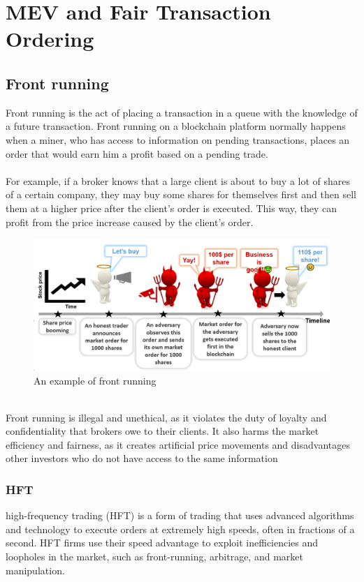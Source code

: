 \chapter{MEV and Fair Transaction Ordering}

\section{Front running}
Front running is the act of placing a transaction in a queue with the knowledge of a future transaction. Front running on a blockchain platform normally happens when a miner, who has access to information on pending transactions, places an order that would earn him a profit based on a pending trade.\\\\
For example, if a broker knows that a large client is about to buy a lot of shares of a certain company, they may buy some shares for themselves first and then sell them at a higher price after the client’s order is executed. This way, they can profit from the price increase caused by the client’s order.
\begin{figure}[h!]
	\centering
	\includegraphics[width=0.7\linewidth]{Fig/21/F1}
	\caption{An example of front running}
	\label{fig:L21_f1}
\end{figure}\\	
Front running is illegal and unethical, as it violates the duty of loyalty and confidentiality that brokers owe to their clients. It also harms the market efficiency and fairness, as it creates artificial price movements and disadvantages other investors who do not have access to the same information

\subsection{HFT}
high-frequency trading (HFT) is a form of trading that uses advanced algorithms and technology to execute orders at extremely high speeds, often in fractions of a second. HFT firms use their speed advantage to exploit inefficiencies and loopholes in the market, such as front-running, arbitrage, and market manipulation. 


